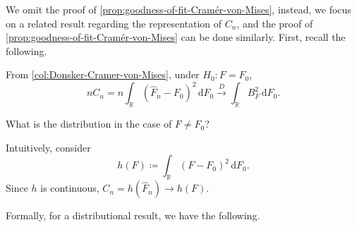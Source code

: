 We omit the proof of \autoref{prop:goodness-of-fit-Cramér-von-Mises}, instead, we focus on a related result regarding the representation of \(C_n\), and the proof of \autoref{prop:goodness-of-fit-Cramér-von-Mises} can be done similarly. First, recall the following.

\begin{prev}
	From \autoref{col:Donsker-Cramer-von-Mises}, under \(H_0 \colon F = F_0\),
	\[
		n C_n
		= n \int _\mathbb{R} (\hat{F} _n - F_0)^2 \,\mathrm{d} F_0
		\overset{D}{\to } \int _\mathbb{R} B_F^2 \,\mathrm{d} F_0.
	\]
\end{prev}

\begin{problem*}
	What is the distribution in the case of \(F \neq F_0\)?
\end{problem*}
\begin{answer}
	Intuitively, consider
	\[
		h(F) \coloneqq \int _\mathbb{R} (F - F_0)^2 \,\mathrm{d} F_0.
	\]
	Since \(h\) is continuous, \(C_n = h(\hat{F} _n) \to h(F) \).
\end{answer}

Formally, for a distributional result, we have the following.

